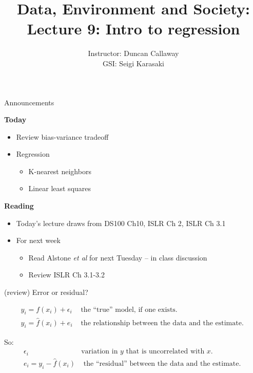 \documentclass[aspectratio=169]{beamer}
\title[Lecture 9: Regression] %
{Data, Environment and Society: \\{Lecture 9: Intro to regression}}
\author[ER190C: Data, Environment and Society] 
{Instructor: Duncan Callaway\\
GSI: Seigi Karasaki}
\institute[UC Berkeley] %
 {\small{ \bf September 20, 2018}}
\date[September 20, 2018]
\begin{document}
\begin{frame}
  \titlepage
\end{frame}

\begin{frame}{Announcements}

\textbf{Today}
\begin{itemize}
\item Review bias-variance tradeoff
\item Regression
\begin{itemize}
	\item K-nearest neighbors
	\item Linear least squares
\end{itemize}
\end{itemize}

\textbf{Reading}
\begin{itemize}
\item Today's lecture draws from DS100 Ch10, ISLR Ch 2, ISLR Ch 3.1
\item For next week
\begin{itemize}
\item Read Alstone \textit{et al} for next Tuesday -- in class discussion
\item Review ISLR Ch 3.1-3.2
\end{itemize}
\end{itemize}

\end{frame}

\begin{frame}{(review) Error or residual?}

\begin{eqnarray*}
y_i = f(x_i) + \epsilon_i & \text{ the ``true'' model, if one exists. }\\
y_i = \hat{f}(x_i) + e_i & \text{ the relationship between the data and the estimate. }
\end{eqnarray*}

\hspace{5mm}

\pause
So:
\begin{eqnarray*}
\epsilon_i&\text{variation in $y$ that is uncorrelated with $x$.}\\
e_i = y_i - \hat{f}(x_i) & \text{ the ``residual'' between the data and the estimate. }
\end{eqnarray*}

\end{frame}
\end{document}

